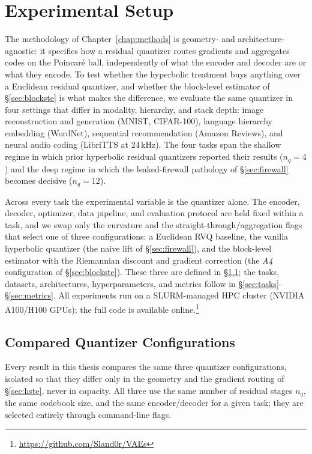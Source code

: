 \documentclass[12pt]{report}
\begin{document}
\chapter{Experimental Setup}
\label{chap:expsetup}

The methodology of Chapter~\ref{chap:methods} is geometry- and architecture-agnostic: it specifies how a residual quantizer routes gradients and aggregates codes on the Poincar\'e ball, independently of what the encoder and decoder are or what they encode. To test whether the hyperbolic treatment buys anything over a Euclidean residual quantizer, and whether the block-level estimator of \S\ref{sec:blockste} is what makes the difference, we evaluate the same quantizer in four settings that differ in modality, hierarchy, and stack depth: image reconstruction and generation (MNIST, CIFAR-100), language hierarchy embedding (WordNet), sequential recommendation (Amazon Reviews), and neural audio coding (LibriTTS at 24\,kHz). The four tasks span the shallow regime in which prior hyperbolic residual quantizers reported their results ($n_q=4$) and the deep regime in which the leaked-firewall pathology of \S\ref{sec:firewall} becomes decisive ($n_q=12$).

Across every task the experimental variable is the quantizer alone. The encoder, decoder, optimizer, data pipeline, and evaluation protocol are held fixed within a task, and we swap only the curvature and the straight-through/aggregation flags that select one of three configurations: a Euclidean RVQ baseline, the vanilla hyperbolic quantizer (the naive lift of \S\ref{sec:firewall}), and the block-level estimator with the Riemannian discount and gradient correction (the \emph{A4} configuration of \S\ref{sec:blockste}). These three are defined in \S\ref{sec:configs}; the tasks, datasets, architectures, hyperparameters, and metrics follow in \S\ref{sec:tasks}--\S\ref{sec:metrics}. All experiments run on a SLURM-managed HPC cluster (NVIDIA A100/H100 GPUs); the full code is available online.\footnote{\url{https://github.com/Sland0r/VAEs}}

\section{Compared Quantizer Configurations}
\label{sec:configs}

Every result in this thesis compares the same three quantizer configurations, isolated so that they differ only in the geometry and the gradient routing of \S\ref{sec:hste}, never in capacity. All three use the same number of residual stages $n_q$, the same codebook size, and the same encoder/decoder for a given task; they are selected entirely through command-line flags.
\end{document}

